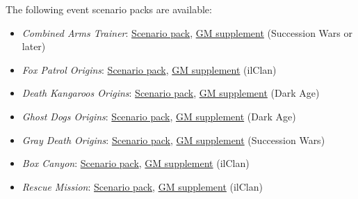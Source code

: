 The following event scenario packs are available:

\begin{itemize}

\item \emph{Combined Arms Trainer}: \href{https://raw.githubusercontent.com/Eudicods/outworlds-wastes/rules-pdf/combined-arms-trainer.pdf}{Scenario pack}, \href{https://raw.githubusercontent.com/Eudicods/outworlds-wastes/rules-pdf/combined-arms-trainer-gm-only.pdf}{GM supplement} (Succession Wars or later)

\item \emph{Fox Patrol Origins}: \href{https://raw.githubusercontent.com/Eudicods/outworlds-wastes/rules-pdf/fox-patrol-origins.pdf}{Scenario pack}, \href{https://raw.githubusercontent.com/Eudicods/outworlds-wastes/rules-pdf/fox-patrol-origins-gm-only.pdf}{GM supplement} (ilClan)

\item \emph{Death Kangaroos Origins}: \href{https://raw.githubusercontent.com/Eudicods/outworlds-wastes/rules-pdf/death-kangaroos-origins.pdf}{Scenario pack}, \href{https://raw.githubusercontent.com/Eudicods/outworlds-wastes/rules-pdf/death-kangaroos-origins-gm-only.pdf}{GM supplement} (Dark Age)

\item \emph{Ghost Dogs Origins}: \href{https://raw.githubusercontent.com/Eudicods/outworlds-wastes/rules-pdf/ghost-dogs-origins.pdf}{Scenario pack}, \href{https://raw.githubusercontent.com/Eudicods/outworlds-wastes/rules-pdf/ghost-dogs-origins-gm-only.pdf}{GM supplement} (Dark Age)

\item \emph{Gray Death Origins}: \href{https://raw.githubusercontent.com/Eudicods/outworlds-wastes/rules-pdf/gray-death-origins.pdf}{Scenario pack}, \href{https://raw.githubusercontent.com/Eudicods/outworlds-wastes/rules-pdf/gray-death-origins-gm-only.pdf}{GM supplement} (Succession Wars)

\item \emph{Box Canyon}: \href{https://raw.githubusercontent.com/Eudicods/outworlds-wastes/rules-pdf/box-canyon.pdf}{Scenario pack}, \href{https://raw.githubusercontent.com/Eudicods/outworlds-wastes/rules-pdf/box-canyon-gm-only.pdf}{GM supplement} (ilClan)

\item \emph{Rescue Mission}: \href{https://raw.githubusercontent.com/Eudicods/outworlds-wastes/rules-pdf/rescue-mission.pdf}{Scenario pack}, \href{https://raw.githubusercontent.com/Eudicods/outworlds-wastes/rules-pdf/rescue-mission-gm-only.pdf}{GM supplement} (ilClan)


\end{itemize}
